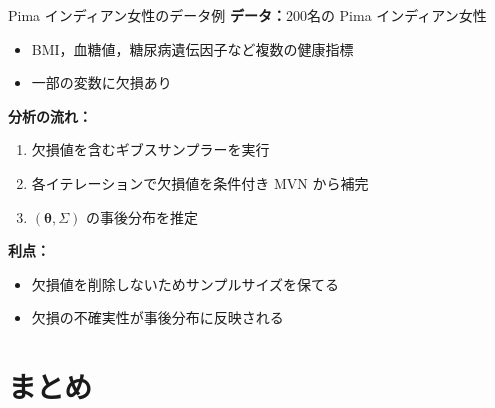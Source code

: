 \documentclass[lualatex,aspectratio=169,12pt]{beamer}
\begin{document}
\begin{frame}{Pima インディアン女性のデータ例}
  \textbf{データ：}200名の Pima インディアン女性
  \begin{itemize}
    \item BMI，血糖値，糖尿病遺伝因子など複数の健康指標
    \item 一部の変数に欠損あり
  \end{itemize}

  \bigskip
  \textbf{分析の流れ：}
  \begin{enumerate}
    \item 欠損値を含むギブスサンプラーを実行
    \item 各イテレーションで欠損値を条件付き MVN から補完
    \item $(\bm{\theta}, \Sigma)$ の事後分布を推定
  \end{enumerate}

  \bigskip
  \textbf{利点：}
  \begin{itemize}
    \item 欠損値を削除しないためサンプルサイズを保てる
    \item 欠損の不確実性が事後分布に反映される
  \end{itemize}
\end{frame}

\section{まとめ}
\end{document}
